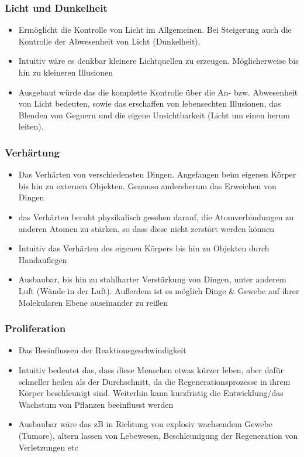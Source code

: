 \subsubsection{Licht und Dunkelheit}
\begin{itemize}
	\item Ermöglicht die Kontrolle von Licht im Allgemeinen. Bei Steigerung auch die Kontrolle der Abwesenheit von Licht (Dunkelheit).
	\item Intuitiv wäre es denkbar kleinere Lichtquellen zu erzeugen. Möglicherweise bis hin zu kleineren Illusionen
	\item Ausgebaut würde das die komplette Kontrolle über die An- bzw. Abwesenheit von Licht bedeuten, sowie das erschaffen von lebensechten Illusionen, das Blenden von Gegnern und die eigene Unsichtbarkeit (Licht um einen herum leiten).
\end{itemize}

\subsubsection{Verhärtung}
\begin{itemize}
	\item Das Verhärten von verschiedensten Dingen. Angefangen beim eigenen Körper bis hin zu externen Objekten. Genauso andersherum das Erweichen von Dingen
	\item das Verhärten beruht physikalisch gesehen darauf, die Atomverbindungen zu anderen Atomen zu stärken, so dass diese nicht zerstört werden können
	\item Intuitiv das Verhärten des eigenen Körpers bis hin zu Objekten durch Handauflegen
	\item Ausbaubar, bis hin zu stahlharter Verstärkung von Dingen, unter anderem Luft (Wände in der Luft). Außerdem ist es möglich Dinge \& Gewebe auf ihrer Molekularen Ebene auseinander zu reißen
\end{itemize}

\subsubsection{Proliferation}
\begin{itemize}
	\item Das Beeinflussen der Reaktionsgeschwindigkeit
	\item Intuitiv bedeutet das, dass diese Menschen etwas kürzer leben, aber dafür schneller heilen als der Durchschnitt, da die Regenerationsprozesse in ihrem Körper beschleunigt sind. Weiterhin kann kurzfristig die Entwicklung/das Wachstum von Pflanzen beeinflusst werden
	\item Ausbaubar wäre das zB in Richtung von explosiv wachsendem Gewebe (Tumore), altern lassen von Lebewesen, Beschleunigung der Regeneration von Verletzungen etc
\end{itemize}

